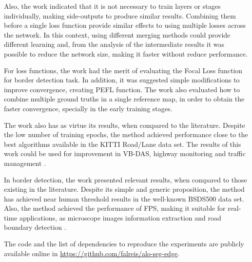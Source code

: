 Also, the work indicated that it is not necessary to train layers or stages individually, making side-outputs to produce similar results.
Combining them before a single loss function provide similar effects to using multiple losses across the network.
In this context, using different merging methods could provide different learning and, from the analysis of the intermediate results it was possible to reduce the network size, making it faster without reduce performance.

For loss functions, the work had the merit of evaluating the Focal Loss \cite{Lin:2017} function for border detection task.
In addition, it was suggested simple modifications to improve convergence, creating PEFL function.
The work also evaluated how to combine multiple ground truths in a single reference map, in order to obtain the faster convergence, specially in the early training stages.

The work also has as virtue its results, when compared to the literature.
Despite the low number of training epochs, the method achieved performance close to the best algorithms available in the KITTI Road/Lane data set.
The results of this work could be used for improvement in VB-DAS, highway monitoring and traffic management \cite{Reis:2019}.

In border detection, the work presented relevant results, when compared to those existing in the literature.
Despite its simple and generic proposition, the method has achieved near human threshold results in the well-known BSDS500 data set.
Also, the method achieved the performance of \myFPS FPS, making it suitable for real-time applications, as microscope images information extraction and road boundary detection \cite{Qu:2020} \cite{Li:2020} \cite{Perng:2020}.


The code and the list of dependencies to reproduce the experiments are publicly available online in \url{https://github.com/falreis/alo-seg-edge}.

